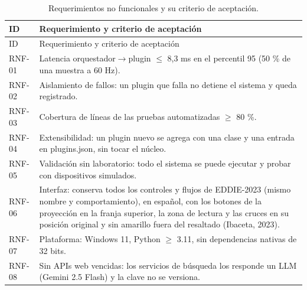 \begin{longtable}{p{1.8cm} p{12.6cm}}
\caption{Requerimientos no funcionales y su criterio de aceptación.}\label{tab:rnf}\\
\toprule ID & Requerimiento y criterio de aceptación \\ \midrule \endfirsthead
\toprule ID & Requerimiento y criterio de aceptación \\ \midrule \endhead
\bottomrule \endfoot
RNF-01 & Latencia orquestador$\rightarrow$plugin $\leq$ 8,3 ms en el percentil 95 (50 \% de una muestra a 60 Hz). \\
RNF-02 & Aislamiento de fallos: un plugin que falla no detiene el sistema y queda registrado. \\
RNF-03 & Cobertura de líneas de las pruebas automatizadas $\geq$ 80 \%. \\
RNF-04 & Extensibilidad: un plugin nuevo se agrega con una clase y una entrada en plugins.json, sin tocar el núcleo. \\
RNF-05 & Validación sin laboratorio: todo el sistema se puede ejecutar y probar con dispositivos simulados. \\
RNF-06 & Interfaz: conserva todos los controles y flujos de EDDIE-2023 (mismo nombre y comportamiento), en español, con los botones de la proyección en la franja superior, la zona de lectura y las cruces en su posición original y sin amarillo fuera del resaltado (Ibaceta, 2023). \\
RNF-07 & Plataforma: Windows 11, Python $\geq$ 3.11, sin dependencias nativas de 32 bits. \\
RNF-08 & Sin APIs web vencidas: los servicios de búsqueda los responde un LLM (Gemini 2.5 Flash) y la clave no se versiona. \\
\end{longtable}
